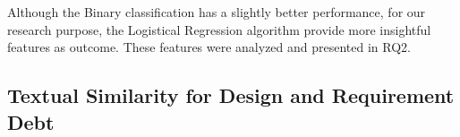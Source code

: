 Although the Binary classification has a slightly better performance, for our research purpose, the Logistical Regression algorithm provide more insightful features as outcome. These features were analyzed and presented in RQ2. 

\subsection{Textual Similarity for Design and Requirement Debt}
